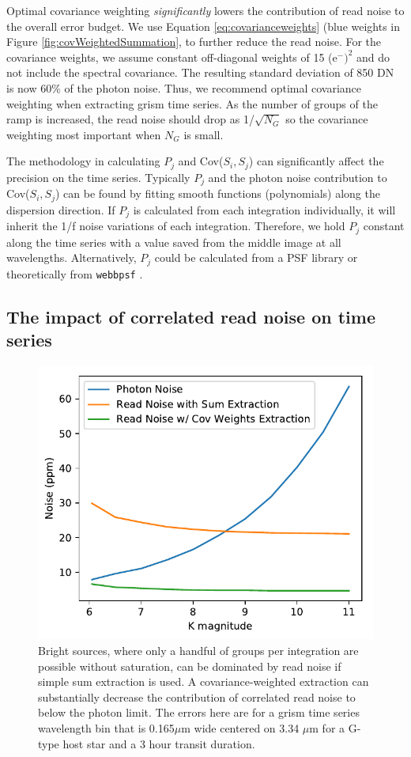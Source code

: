 \documentclass[]{aastex62}
\begin{document}
Optimal covariance weighting {\it significantly} lowers the contribution of read noise to the overall error budget.
We use Equation \ref{eq:covarianceweights} (blue weights in Figure \ref{fig:covWeightedSummation}, to further reduce the read noise.
For the covariance weights, we assume constant off-diagonal weights of 15 (e$^-)^2$ and do not include the spectral covariance.
The resulting standard deviation of 850 DN is now 60\% of the photon noise.
Thus, we recommend optimal covariance weighting when extracting grism time series.
As the number of groups of the ramp is increased, the read noise should drop as 1/$\sqrt{N_G}$ so the covariance weighting most important when $N_G$ is small.

The methodology in calculating $P_j$ and Cov($S_i,S_j$) can significantly affect the precision on the time series.
Typically $P_j$ and the photon noise contribution to Cov($S_i,S_j$) can be found by fitting smooth functions (polynomials) along the dispersion direction.
If $P_j$ is calculated from each integration individually, it will inherit the 1/f noise variations of each integration.
Therefore, we hold $P_j$ constant along the time series with a value saved from the middle image at all wavelengths.
Alternatively, $P_j$ could be calculated from a PSF library or theoretically from \texttt{webbpsf} \citep{perrin2014webbpsf}.

\subsection{The impact of correlated read noise on time series}

\begin{figure}[!hbtp]
\centering
\includegraphics[width=.49\columnwidth]{generic_src_errors.pdf}
\caption{Bright sources, where only a handful of groups per integration are possible without saturation, can be dominated by read noise if simple sum extraction is used.
A covariance-weighted extraction can substantially decrease the contribution of correlated read noise to below the photon limit.
The errors here are for a grism time series wavelength bin that is 0.165$\mu$m wide centered on 3.34 $\mu$m for a G-type host star and a 3 hour transit duration.
}\label{fig:genericSourceErrorContrib}
\end{figure}
\end{document}
